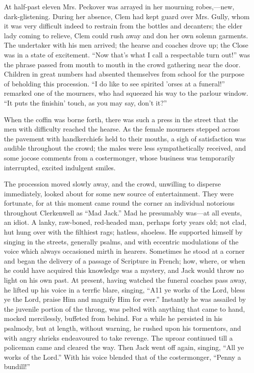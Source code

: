 At half-past eleven Mrs. Peckover was arrayed in her mourning
robes,---new, dark-glistening. During her absence, Clem had kept guard
over Mrs. Gully, whom it was very difficult indeed to restrain from the
bottles and decanters; the elder lady coming to relieve, Clem could rush
away and don her own solemn garments. The undertaker with his men
arrived; the hearse and coaches drove up; the Close was in a state of
excitement. ``Now that's what I call a respectable turn out!'' was the
phrase passed from mouth to mouth in the crowd gathering near the door.
Children in great numbers had {\protect\hypertarget{101}{}{}}absented
themselves from school for the purpose of beholding this procession. ``I
do like to see spirited 'orses at a funeral!'' remarked one of the
mourners, who had squeezed his way to the parlour window. ``It puts the
finishin' touch, as you may say, don't it?''

When the coffin was borne forth, there was such a press in the street
that the men with difficulty reached the hearse. As the female mourners
stepped across the pavement with handkerchiefs held to their mouths, a
sigh of satisfaction was audible throughout the crowd; the males were
less sympathetically received, and some jocose comments from a
costermonger, whose business was temporarily interrupted, excited
indulgent smiles.

The procession moved slowly away, and the crowd, unwilling to disperse
immediately, looked about for some new source of entertainment. They
were fortunate, for at this moment came round the corner an individual
notorious throughout Clerkenwell as ``Mad Jack.'' Mad he presumably
was---at all events, an idiot. A lanky, raw-boned,
{\protect\hypertarget{102}{}{}}red-headed man, perhaps forty years old;
not clad, hut hung over with the filthiest rags; hatless, shoeless. He
supported himself by singing in the streets, generally psalms, and with
eccentric modulations of the voice which always occasioned mirth in
hearers. Sometimes he stood at a corner and began the delivery of a
passage of Scripture in French; how, where, or when he could have
acquired this knowledge was a mystery, and Jack would throw no light on
his own past. At present, having watched the funeral coaches pass away,
he lifted up his voice in a terrfic blare, singing, ``A11 ye works of
the Lord, bless ye the Lord, praise Him and magnify Him for ever.''
Instantly he was assailed by the juvenile portion of the throng, was
pelted with anything that came to hand, mocked mercilessly, buffeted
from behind. For a while he persisted in his psalmody, but at length,
without warning, he rushed upon his tormentors, and with angry shrieks
endeavoured to take revenge. The uproar continued till a policeman came
and cleared {\protect\hypertarget{103}{}{}}the way. Then Jack went off
again, singing, ``All ye works of the Lord.'' With his voice blended
that of the costermonger, ``Penny a bundill!''

